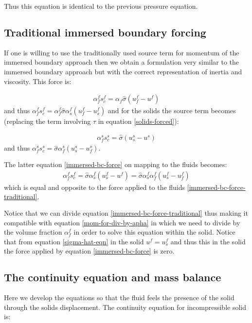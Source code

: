 Thus this equation is identical to the previous pressure equation. 

\subsection{Traditional immersed boundary forcing} 
If one is willing to use the traditionally used 
source term for momentum of the immersed boundary 
approach then we obtain a formulation very similar to the 
immersed boundary approach but with the correct 
representation of inertia and viscosity. 
This force is:

\begin{eqnarray}
\alpha_f^f s_c^f = \alpha_f \hat\sigma (u^f_f -u^f)
\label{immersed-bc-force-traditional}
\end{eqnarray}
and thus $\alpha_f^f s_c^f = \alpha_f^f \hat\sigma \alpha_s^f (u^f_f -u^f_s)$  
and for the solids the source term becomes 
(replacing the term involving $\tau$ in equation \ref{solids-forced}): 

\begin{eqnarray}
\alpha_f^s s_c^s=\hat \sigma (u_s^s -u^s)
\label{immersed-bc-force}
\end{eqnarray}
and thus 
$ \alpha_f^s s_c^s=\hat \sigma \alpha_f^s(u_s^s -u^s_f)$.

The latter equation \ref{immersed-bc-force} on mapping to the fluids becomes:
\begin{eqnarray}
\alpha_f^f s_c^f=\hat \sigma \alpha_s^f (u_s^f -u^f)
=\hat\sigma \alpha_s^f \alpha_f^f(u_s^f -u^f_f)
\end{eqnarray} which 
is equal and opposite to the force applied to the fluids \ref{immersed-bc-force-traditional}. 

Notice that we can divide equation \ref{immersed-bc-force-traditional} 
thus making it compatible with equation \ref{mom-for-div-by-apha} in which we need to 
divide by the volume fraction $\alpha_f^f$ in order to solve this equation 
within the solid. 
Notice that from equation \ref{sigma-hat-eqn} in the solid $u^f=u^f_s$ and thus this 
in the solid the force applied by equation \ref{immersed-bc-force} is zero. 


\subsection{The continuity equation and mass balance} 

Here we develop the equations so that the fluid feels the presence of the solid through 
the solids displacement. 
The continuity equation for incompressible solid is: 


